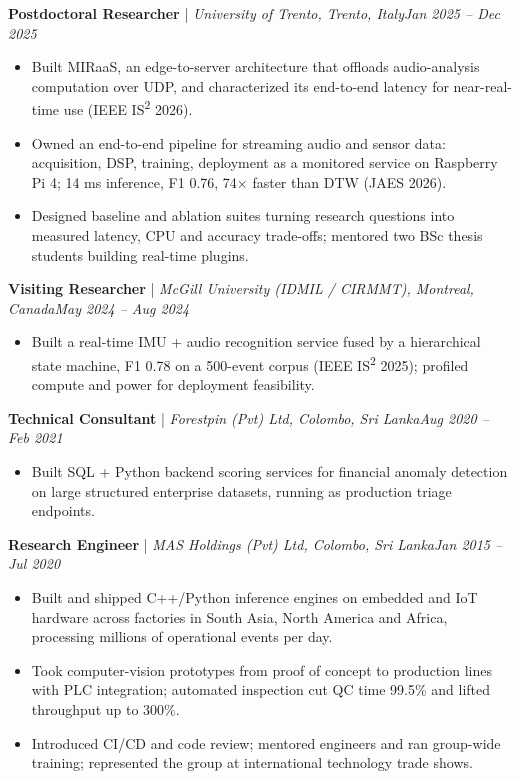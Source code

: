 \documentclass[11pt]{article}
\newenvironment{cvrole}[5]{%
  \par\noindent\textbf{\large #1} | \textit{\small #2, #3}\hfill \textit{\small #4 -- #5}\par
  \begin{itemize}[leftmargin=2em, itemsep=-0.3em, topsep=-0.5em]%
}{%
  \end{itemize}\par\noindent\mbox{}\par\vspace{0.1em}%
}
\begin{document}
\begin{cvrole}{Postdoctoral Researcher}{University of Trento}{Trento, Italy}{Jan 2025}{Dec 2025}
    \item Built MIRaaS, an edge-to-server architecture that offloads audio-analysis computation over UDP, and characterized its end-to-end latency for near-real-time use (IEEE IS\textsuperscript{2} 2026).
    \item Owned an end-to-end pipeline for streaming audio and sensor data: acquisition, DSP, training, deployment as a monitored service on Raspberry Pi 4; 14 ms inference, F1 0.76, 74$\times$ faster than DTW (JAES 2026).
    \item Designed baseline and ablation suites turning research questions into measured latency, CPU and accuracy trade-offs; mentored two BSc thesis students building real-time plugins.
\end{cvrole}

\begin{cvrole}{Visiting Researcher}{McGill University (IDMIL / CIRMMT)}{Montreal, Canada}{May 2024}{Aug 2024}
    \item Built a real-time IMU + audio recognition service fused by a hierarchical state machine, F1 0.78 on a 500-event corpus (IEEE IS\textsuperscript{2} 2025); profiled compute and power for deployment feasibility.
\end{cvrole}

\begin{cvrole}{Technical Consultant}{Forestpin (Pvt) Ltd}{Colombo, Sri Lanka}{Aug 2020}{Feb 2021}
    \item Built SQL + Python backend scoring services for financial anomaly detection on large structured enterprise datasets, running as production triage endpoints.
\end{cvrole}

\begin{cvrole}{Research Engineer}{MAS Holdings (Pvt) Ltd}{Colombo, Sri Lanka}{Jan 2015}{Jul 2020}
    \item Built and shipped C++/Python inference engines on embedded and IoT hardware across factories in South Asia, North America and Africa, processing millions of operational events per day.
    \item Took computer-vision prototypes from proof of concept to production lines with PLC integration; automated inspection cut QC time 99.5\% and lifted throughput up to 300\%.
    \item Introduced CI/CD and code review; mentored engineers and ran group-wide training; represented the group at international technology trade shows.
\end{cvrole}
\end{document}
